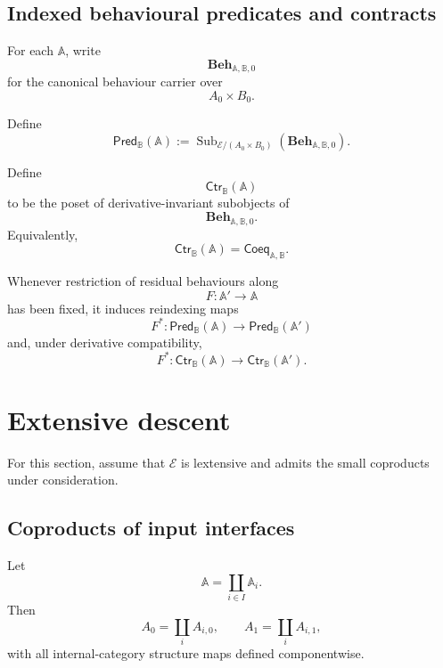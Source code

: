 \subsection{Indexed behavioural predicates and contracts}
\label{subsec:indexed-predicates-contracts}

For each \(\mathbb A\), write
\[
    \mathbf{Beh}_{\mathbb A,\mathbb B,0}
\]
for the canonical behaviour carrier over
\[
    A_0\times B_0.
\]

\begin{definition}
\label{def:indexed-behavioural-predicates}
Define
\[
    \mathsf{Pred}_{\mathbb B}(\mathbb A)
    :=
    \operatorname{Sub}_{\mathcal E/(A_0\times B_0)}
    \left(
    \mathbf{Beh}_{\mathbb A,\mathbb B,0}
    \right).
\]
\end{definition}

\begin{definition}
\label{def:indexed-residual-contracts}
Define
\[
    \mathsf{Ctr}_{\mathbb B}(\mathbb A)
\]
to be the poset of derivative-invariant subobjects of
\[
    \mathbf{Beh}_{\mathbb A,\mathbb B,0}.
\]
Equivalently,
\[
    \mathsf{Ctr}_{\mathbb B}(\mathbb A)
    =
    \mathsf{Coeq}_{\mathbb A,\mathbb B}.
\]
\end{definition}

Whenever restriction of residual behaviours along
\[
    F:\mathbb A'\to\mathbb A
\]
has been fixed, it induces reindexing maps
\[
    F^\ast:
    \mathsf{Pred}_{\mathbb B}(\mathbb A)
    \to
    \mathsf{Pred}_{\mathbb B}(\mathbb A')
\]
and, under derivative compatibility,
\[
    F^\ast:
    \mathsf{Ctr}_{\mathbb B}(\mathbb A)
    \to
    \mathsf{Ctr}_{\mathbb B}(\mathbb A').
\]

\section{Extensive descent}
\label{sec:extensive-descent}

For this section, assume that \(\mathcal E\) is lextensive and admits the
small coproducts under consideration.

\subsection{Coproducts of input interfaces}
\label{subsec:coproducts-input-interfaces}

Let
\[
    \mathbb A
    =
    \coprod_{i\in I}\mathbb A_i.
\]
Then
\[
    A_0=\coprod_i A_{i,0},
    \qquad
    A_1=\coprod_i A_{i,1},
\]
with all internal-category structure maps defined componentwise.


